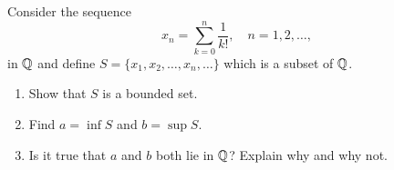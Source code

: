 \begingroup
\renewcommand{\labelenumi}{(\alph{enumi})}
\begin{exercise}
  \label{ex:hw02:factorial-sequence}
  Consider the sequence
  \[
    x_n=\sum_{k=0}^{n}\frac{1}{k!},\quad n=1,2,\ldots,
  \]
  in $\mathbb{Q}$ and define $S=\{x_1,x_2,\ldots,x_n,\ldots\}$ which is a subset of $\mathbb{Q}$.
  \begin{enumerate}
    \item Show that $S$ is a bounded set.
    \item Find $a=\inf S$ and $b=\sup S$.
    \item Is it true that $a$ and $b$ both lie in $\mathbb{Q}$?
      Explain why and why not.
  \end{enumerate}
\end{exercise}
\endgroup
